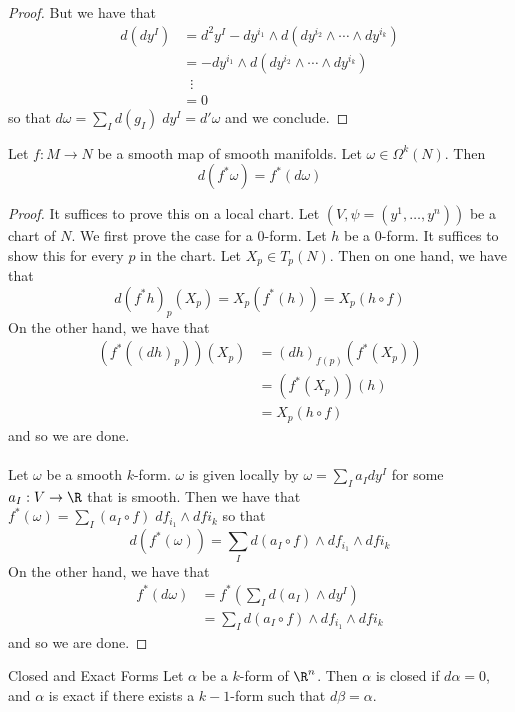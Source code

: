 \documentclass[a4paper]{article}
\begin{document}
\begin{prp}{}{}
\begin{proof}
But we have that 
\begin{align*}
d(dy^I)&=d^2y^I-dy^{i_1}\wedge d(dy^{i_2}\wedge\cdots\wedge dy^{i_k})\\
&=-dy^{i_1}\wedge d(dy^{i_2}\wedge\cdots\wedge dy^{i_k})\\
&\;\;\vdots\\
&=0
\end{align*}
so that $d\omega=\sum_Id(g_I)\;dy^I=d'\omega$ and we conclude. 
\end{proof}
\end{prp}

\begin{prp}{}{} Let $f:M\to N$ be a smooth map of smooth manifolds. Let $\omega\in\Omega^k(N)$. Then $$d(f^\ast\omega)=f^\ast(d\omega)$$ \tcbline
\begin{proof}
It suffices to prove this on a local chart. Let $(V,\psi=(y^1,\dots,y^n))$ be a chart of $N$. We first prove the case for a $0$-form. Let $h$ be a $0$-form. It suffices to show this for every $p$ in the chart. Let $X_p\in T_p(N)$. Then on one hand, we have that $$d(f^\ast h)_p(X_p)=X_p(f^\ast(h))=X_p(h\circ f)$$ On the other hand, we have that 
\begin{align*}
(f^\ast((dh)_p))(X_p)&=(dh)_{f(p)}(f^\ast(X_p))\tag{Pull back of a one form}\\
&=(f^\ast(X_p))(h)\tag{Definition of the differntial}\\
&=X_p(h\circ f)\tag{Definition of $f^\ast$}
\end{align*} and so we are done. \\~\\

Let $\omega$ be a smooth $k$-form. $\omega$ is given locally by $\omega=\sum_Ia_Idy^I$ for some $a_I:V\to\R$ that is smooth. Then we have that $f^\ast(\omega)=\sum_I(a_I\circ f)\;df_{i_1}\wedge df{i_k}$ so that $$d(f^\ast(\omega))=\sum_Id(a_I\circ f)\wedge df_{i_1}\wedge df{i_k}$$ On the other hand, we have that 
\begin{align*}
f^\ast(d\omega)&=f^\ast\left(\sum_Id(a_I)\wedge dy^I\right)\\
&=\sum_Id(a_I\circ f)\wedge df_{i_1}\wedge df{i_k}
\end{align*}
and so we are done. 
\end{proof}
\end{prp}

\begin{defn}{Closed and Exact Forms}{} Let $\alpha$ be a $k$-form of $\R^n$. Then $\alpha$ is closed if $d\alpha=0$, and $\alpha$ is exact if there exists a $k-1$-form such that $d\beta=\alpha$. 
\end{defn}
\end{document}
